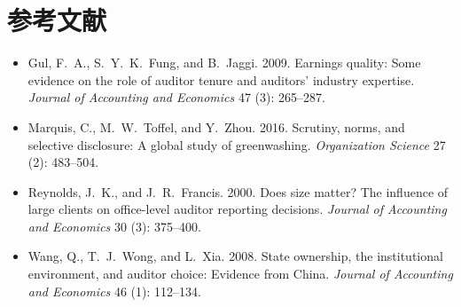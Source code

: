 \documentclass[11pt]{article}
\begin{document}
\section{参考文献}

\begin{itemize}
\item Gul, F.~A., S.~Y.~K.~Fung, and B.~Jaggi. 2009. Earnings quality: Some evidence on the role of auditor tenure and auditors' industry expertise. \textit{Journal of Accounting and Economics} 47 (3): 265--287.
\item Marquis, C., M.~W.~Toffel, and Y.~Zhou. 2016. Scrutiny, norms, and selective disclosure: A global study of greenwashing. \textit{Organization Science} 27 (2): 483--504.
\item Reynolds, J.~K., and J.~R.~Francis. 2000. Does size matter? The influence of large clients on office-level auditor reporting decisions. \textit{Journal of Accounting and Economics} 30 (3): 375--400.
\item Wang, Q., T.~J.~Wong, and L.~Xia. 2008. State ownership, the institutional environment, and auditor choice: Evidence from China. \textit{Journal of Accounting and Economics} 46 (1): 112--134.
\end{itemize}
\end{document}
